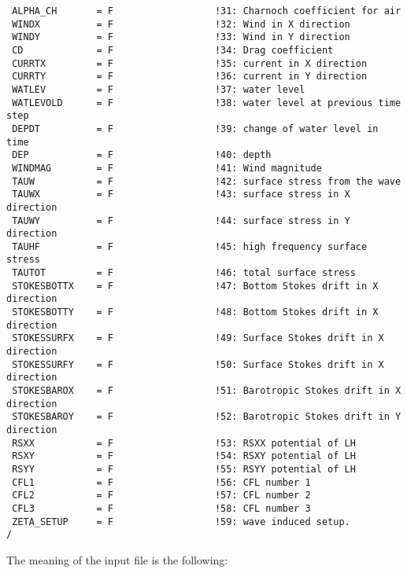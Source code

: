 \documentclass[12pt]{amsart}
\begin{document}
\begin{verbatim}
 ALPHA_CH       = F                  !31: Charnoch coefficient for air
 WINDX          = F                  !32: Wind in X direction
 WINDY          = F                  !33: Wind in Y direction
 CD             = F                  !34: Drag coefficient
 CURRTX         = F                  !35: current in X direction
 CURRTY         = F                  !36: current in Y direction
 WATLEV         = F                  !37: water level
 WATLEVOLD      = F                  !38: water level at previous time step
 DEPDT          = F                  !39: change of water level in time
 DEP            = F                  !40: depth
 WINDMAG        = F                  !41: Wind magnitude
 TAUW           = F                  !42: surface stress from the wave
 TAUWX          = F                  !43: surface stress in X direction
 TAUWY          = F                  !44: surface stress in Y direction
 TAUHF          = F                  !45: high frequency surface stress
 TAUTOT         = F                  !46: total surface stress
 STOKESBOTTX    = F                  !47: Bottom Stokes drift in X direction
 STOKESBOTTY    = F                  !48: Bottom Stokes drift in X direction
 STOKESSURFX    = F                  !49: Surface Stokes drift in X direction
 STOKESSURFY    = F                  !50: Surface Stokes drift in X direction
 STOKESBAROX    = F                  !51: Barotropic Stokes drift in X direction
 STOKESBAROY    = F                  !52: Barotropic Stokes drift in Y direction
 RSXX           = F                  !53: RSXX potential of LH
 RSXY           = F                  !54: RSXY potential of LH
 RSYY           = F                  !55: RSYY potential of LH
 CFL1           = F                  !56: CFL number 1
 CFL2           = F                  !57: CFL number 2
 CFL3           = F                  !58: CFL number 3
 ZETA_SETUP     = F                  !59: wave induced setup.
/
\end{verbatim}
The meaning of the input file is the following:
\end{document}

